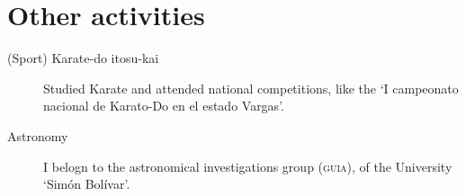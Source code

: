 \documentclass[draft,letterpaper,10pt]{article}
\newcommand{\entryone}[2]{
{\noindent\textsc{#1}}
\begin{quotation}
	\noindent#2.
\end{quotation}
}
\let\oldtextsc=\textsc
\renewcommand{\textsc}[1]{\oldtextsc{\MakeLowercase{#1}}}
\begin{document}
\section*{Other activities}
\begin{description}
	\item[(Sport) Karate-do itosu-kai]	Studied Karate and attended national competitions, like the `I campeonato nacional de Karato-Do en el estado Vargas'.
	\item[Astronomy] I belogn to the astronomical investigations group (\textsc{GUIA}), of the University `Simón Bolívar'.
\end{description}
\end{document}
